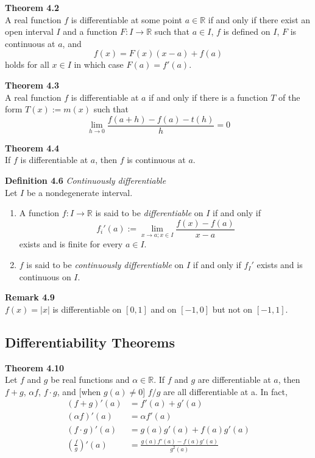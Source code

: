 \documentclass[8pt,landscape]{article}
\begin{document}
\begin{multicols}{3}
    \textbf{Theorem 4.2} \\
    A real function $f$ is differentiable at some point $a \in \mathbb{R}$ if and only if
    there exist an open interval $I$ and a function $F : I \to \mathbb{R}$ such that
    $a \in I$, $f$ is defined on $I$, $F$ is continuous at $a$, and
    \[
        f(x) = F(x) (x-a) + f(a)
    \]
    holds for all $x \in I$ in which case $F(a) = f'(a)$.

    \textbf{Theorem 4.3} \\
    A real function $f$ is differentiable at $a$ if and only if there is a function
    $T$ of the form $T(x) := m(x)$ such that
    \[
        \lim_{h \to 0} \frac{f(a+h) - f(a) - t(h)}{h} = 0
    \]

    \textbf{Theorem 4.4} \\
    If $f$ is differentiable at $a$, then $f$ is continuous at $a$.

    \textbf{Definition 4.6} \emph{Continuously differentiable} \\
    Let $I$ be a nondegenerate interval.
    \begin{enumerate}
        \item A function $f : I \to \mathbb{R}$ is said to be \emph{differentiable}
            on $I$ if and only if
            \[
                f_i'(a) := \lim_{x \to a; x \in I} \frac{f(x) - f(a)}{x-a}
            \]
            exists and is finite for every $a \in I$.
        \item $f$ is said to be \emph{continuously differentiable} on $I$ if and only if
            $f_I'$ exists and is continuous on $I$.
    \end{enumerate}

    \textbf{Remark 4.9} \\
    $f(x) = |x|$ is differentiable on $[0, 1]$ and on $[-1, 0]$ but not on $[-1, 1]$.

    \subsection{Differentiability Theorems}

    \textbf{Theorem 4.10} \\
    Let $f$ and $g$ be real functions and $\alpha \in \mathbb{R}$.
    If $f$ and $g$ are differentiable at $a$, then $f+g$, $\alpha f$, $f \cdot g$,
    and [when $g(a) \neq 0$] $f/g$ are all differentiable at a.
    In fact,
    \begin{align*}{}
        (f+g)'(a) &= f'(a) + g'(a) \\
        (\alpha f)'(a) &= \alpha f'(a) \\
        (f \cdot g)'(a) &= g(a) g'(a) + f(a) g'(a) \\
        \left( \frac{f}{g}\right)'(a) &= \frac{g(a) f'(a) - f(a) g'(a)}{g^2(a)} \\
    \end{align*}


\end{multicols}
\end{document}
